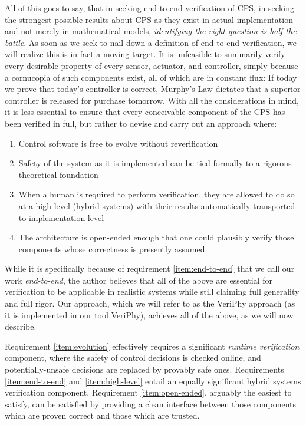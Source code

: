 \documentclass[12pt]{cmuthesis}
\theoremstyle{definition}
\theoremstyle{remark}
\newcommand{\VeriPhy}{VeriPhy\xspace}
\begin{document}
All of this goes to say, that in seeking end-to-end verification of CPS, in seeking the strongest possible results about CPS as they exist in actual implementation and not merely in mathematical models, \emph{identifying the right question is half the battle}.
As soon as we seek to nail down a definition of end-to-end verification, we will realize this is in fact a moving target.
It is unfeasible to summarily verify every desirable property of every sensor, actuator, and controller, simply because a cornucopia of such components exist, all of which are in constant flux: 
If today we prove that today's controller is correct, Murphy's Law dictates that a superior controller is released for purchase tomorrow.
With all the considerations in mind, it is less essential to ensure that every conceivable component of the CPS has been verified in full, but rather to devise and carry out an approach where:
\begin{enumerate}
\item \label{item:evolution} Control software is free to evolve without reverification
\item \label{item:end-to-end} Safety of the system as it is implemented can be tied formally to a rigorous theoretical foundation
\item \label{item:high-level} When a human is required to perform verification, they are allowed to do so at a high level (hybrid systems) with their results automatically transported to implementation level
\item \label{item:open-ended} The architecture is open-ended enough that one could plausibly verify those components whose correctness is presently assumed.
\end{enumerate}
While it is specifically because of requirement \ref{item:end-to-end} that we call our work \emph{end-to-end}, the author believes that all of the above are essential for verification to be applicable in realistic systems while still claiming full generality and full rigor.
Our approach, which we will refer to as the \VeriPhy approach (as it is implemented in our tool \VeriPhy), achieves all of the above, as we will now describe.

Requirement \ref{item:evolution} effectively requires a significant \emph{runtime verification} component, where the safety of control decisions is checked online, and potentially-unsafe decisions are replaced by provably safe ones.
Requirements \ref{item:end-to-end} and \ref{item:high-level} entail an equally significant hybrid systems verification component.
Requirement \ref{item:open-ended}, arguably the easiest to satisfy, can be satisfied by providing a clean interface between those components which are proven correct and those which are trusted.
\end{document}
